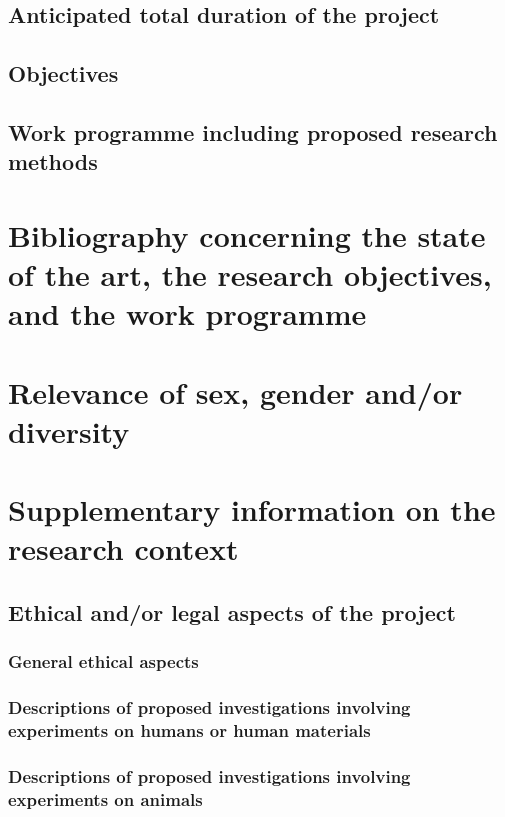 \documentclass{scrartcl}
\begin{document}
\subsection{Anticipated total duration of the project}

\subsection{Objectives}

\subsection{Work programme including proposed research methods}


\section{Bibliography concerning the state of the art, the research objectives, and the work programme}

\printbibliography[notcategory=reviewed, notcategory=nonreviewed, notcategory=patents_pending, notcategory=patents, heading=none]


\section{Relevance of sex, gender and/or diversity}


\section{Supplementary information on the research context}

\subsection{Ethical and/or legal aspects of the project}

\subsubsection{General ethical aspects}

\subsubsection{Descriptions of proposed investigations involving experiments on humans or human materials}

\subsubsection{Descriptions of proposed investigations involving experiments on animals}
\end{document}
